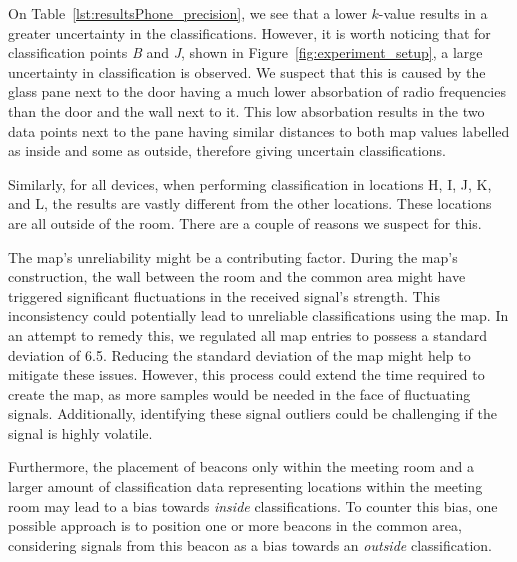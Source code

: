 On Table~\ref{lst:resultsPhone_precision}, we see that a lower $k$-value results in a greater uncertainty in the classifications.
However, it is worth noticing that for classification points \textit{B} and \textit{J}, shown in Figure~\ref{fig:experiment_setup}, a large uncertainty in classification is observed.
We suspect that this is caused by the glass pane next to the door having a much lower absorbation of radio frequencies than the door and the wall next to it. 
This low absorbation results in the two data points next to the pane having similar distances to both map values labelled as inside and some as outside, therefore giving uncertain classifications.

Similarly, for all devices, when performing classification in locations H, I, J, K, and L, the results are vastly different from the other locations.
These locations are all outside of the room. 
There are a couple of reasons we suspect for this. 

The map's unreliability might be a contributing factor. During the map's construction, the wall between the room and the common area might have triggered significant fluctuations in the received signal's strength.
This inconsistency could potentially lead to unreliable classifications using the map. In an attempt to remedy this, we regulated all map entries to possess a standard deviation of 6.5.
Reducing the standard deviation of the map might help to mitigate these issues.
However, this process could extend the time required to create the map, as more samples would be needed in the face of fluctuating signals.
Additionally, identifying these signal outliers could be challenging if the signal is highly volatile.

Furthermore, the placement of beacons only within the meeting room and a larger amount of classification data representing locations within the meeting room may lead to a bias towards \textit{inside} classifications. 
To counter this bias, one possible approach is to position one or more beacons in the common area, considering signals from this beacon as a bias towards an \textit{outside} classification.


